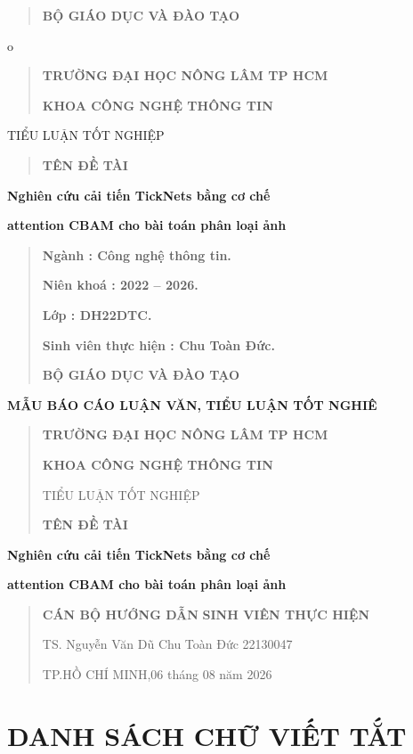 \documentclass[
  12pt,
  a4paper,
]{report}
\author{}
\date{}
\begin{document}
\begin{quote}
\textbf{BỘ GIÁO DỤC VÀ ĐÀO TẠO}
\end{quote}

o

\begin{quote}
\textbf{TRƯỜNG ĐẠI HỌC NÔNG LÂM TP HCM}

\textbf{KHOA CÔNG NGHỆ THÔNG TIN}
\end{quote}

TIỂU LUẬN TỐT NGHIỆP

\begin{quote}
\textbf{TÊN ĐỀ TÀI}
\end{quote}

\textbf{Nghiên cứu cải tiến TickNets bằng cơ chế}

\textbf{attention CBAM cho bài toán phân loại ảnh}

\begin{quote}
\textbf{Ngành : Công nghệ thông tin.}

\textbf{Niên khoá : 2022 -- 2026.}

\textbf{Lớp : DH22DTC.}

\textbf{Sinh viên thực hiện : Chu Toàn Đức.}

\textbf{BỘ GIÁO DỤC VÀ ĐÀO TẠO}
\end{quote}

\textbf{MẪU BÁO CÁO LUẬN VĂN, TIỂU LUẬN TỐT NGHIÊ}

\begin{quote}
\textbf{TRƯỜNG ĐẠI HỌC NÔNG LÂM TP HCM}

\textbf{KHOA CÔNG NGHỆ THÔNG TIN}

TIỂU LUẬN TỐT NGHIỆP

\textbf{TÊN ĐỀ TÀI}
\end{quote}

\textbf{Nghiên cứu cải tiến TickNets bằng cơ chế}

\textbf{attention CBAM cho bài toán phân loại ảnh}

\begin{quote}
\textbf{CÁN BỘ HƯỚNG DẪN} \textbf{SINH VIÊN THỰC HIỆN}

TS. Nguyễn Văn Dũ Chu Toàn Đức 22130047

TP.HỒ CHÍ MINH,06 tháng 08 năm 2026
\end{quote}

\chapter*{DANH SÁCH CHỮ VIẾT
TẮT}\label{danh-suxe1ch-chux1eef-viux1ebft-tux1eaft}
\end{document}
